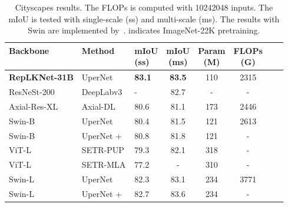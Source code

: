 \documentclass[10pt,twocolumn,letterpaper]{article}
\begin{document}
	\setlength{\tabcolsep}{2pt}
	\begin{table}
		\caption{Cityscapes results. The FLOPs is computed with 10242048 inputs. The mIoU is tested with single-scale (ss) and multi-scale (ms). The results with Swin are implemented by~\cite{gong2021improve}.  indicates ImageNet-22K pretraining.}
		\label{table-compare-cityscapes}
		\vspace{-0.25in}
		\begin{center}		
			\small
			\begin{tabular}{lllccccc}
				\hline
				Backbone			&	Method		&		\makecell{mIoU \\ (ss)}	&	\makecell{mIoU \\ (ms)}	& 	\makecell{Param \\ (M)}	& \makecell{FLOPs \\ (G)}\\
				\hline
				\textbf{RepLKNet-31B}     	&	UperNet \cite{xiao2018unified}		&		\textbf{83.1}		&	\textbf{83.5}			&	110	&	2315\\			
				ResNeSt-200~\cite{resnest}         &   DeepLabv3~\cite{chen2017rethinking}   &       -           &   82.7            &   -       &   -   \\
				Axial-Res-XL	&Axial-DL \cite{wang2020axial}		&	80.6		&	81.1		&	173	&	2446	\\
				Swin-B					&	UperNet		&		80.4		&	81.5		&	121		&	2613	\\	Swin-B &	UperNet + \cite{gong2021improve}		&		80.8		&	81.8		&	121		&	-	\\
				\hline
				ViT-L~	&	SETR-PUP \cite{zheng2021rethinking}	&		79.3		&	82.1		&	318	&	-	\\
				ViT-L~	&	SETR-MLA &		77.2		&	-			&	310	&	-		\\
				Swin-L~	&	UperNet		&		82.3		&	83.1		&	234		&	3771	\\
				Swin-L~     &	UperNet + \cite{gong2021improve}		&		82.7		&	83.6		&	234		&	-	\\
				\hline
			\end{tabular}
		\end{center}
		\vspace{-0.3in}
	\end{table}
	
	
\end{document}
